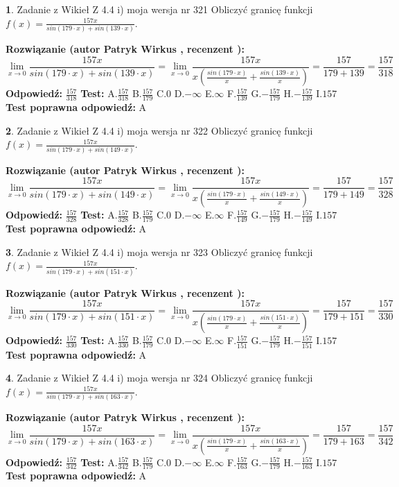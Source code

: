\documentclass[12pt, a4paper]{article}
\theoremstyle{definition} %
\newtheorem{zad}{}
\newcommand{\zadStart}[1]{\begin{zad}#1\newline}
\newcommand{\zadStop}{\end{zad}}
\newcommand{\rozwStart}[2]{\noindent \textbf{Rozwiązanie (autor #1 , recenzent #2): }\newline}
\newcommand{\rozwStop}{\newline}
\newcommand{\odpStart}{\noindent \textbf{Odpowiedź:}\newline}
\newcommand{\odpStop}{\newline}
\newcommand{\testStart}{\noindent \textbf{Test:}\newline}
\newcommand{\testStop}{\newline}
\newcommand{\kluczStart}{\noindent \textbf{Test poprawna odpowiedź:}\newline}
\newcommand{\kluczStop}{\newline}
\begin{document}
\zadStart{Zadanie z Wikieł Z 4.4 i) moja wersja nr 321}
Obliczyć granicę funkcji $f(x)=\frac{157x}{sin(179\cdot x) +sin(139\cdot x)}$.
\zadStop
\rozwStart{Patryk Wirkus}{}
$$\lim\limits_{x\to 0}\frac{157x}{sin(179\cdot x) +sin(139\cdot x)}=\lim\limits_{x\to 0}\frac{157x}{x(\frac{sin(179\cdot x)}{x}+\frac{sin(139\cdot x)}{x})}=\frac{157}{179+139} = \frac{157}{318}$$
\rozwStop
\odpStart
$\frac{157}{318}$
\odpStop
\testStart
A.$\frac{157}{318}$
B.$\frac{157}{179}$
C.$0$
D.$-\infty$
E.$\infty$
F.$\frac{157}{139}$
G.$-\frac{157}{179}$
H.$-\frac{157}{139}$
I.$157$
\testStop
\kluczStart
A
\kluczStop



\zadStart{Zadanie z Wikieł Z 4.4 i) moja wersja nr 322}
Obliczyć granicę funkcji $f(x)=\frac{157x}{sin(179\cdot x) +sin(149\cdot x)}$.
\zadStop
\rozwStart{Patryk Wirkus}{}
$$\lim\limits_{x\to 0}\frac{157x}{sin(179\cdot x) +sin(149\cdot x)}=\lim\limits_{x\to 0}\frac{157x}{x(\frac{sin(179\cdot x)}{x}+\frac{sin(149\cdot x)}{x})}=\frac{157}{179+149} = \frac{157}{328}$$
\rozwStop
\odpStart
$\frac{157}{328}$
\odpStop
\testStart
A.$\frac{157}{328}$
B.$\frac{157}{179}$
C.$0$
D.$-\infty$
E.$\infty$
F.$\frac{157}{149}$
G.$-\frac{157}{179}$
H.$-\frac{157}{149}$
I.$157$
\testStop
\kluczStart
A
\kluczStop



\zadStart{Zadanie z Wikieł Z 4.4 i) moja wersja nr 323}
Obliczyć granicę funkcji $f(x)=\frac{157x}{sin(179\cdot x) +sin(151\cdot x)}$.
\zadStop
\rozwStart{Patryk Wirkus}{}
$$\lim\limits_{x\to 0}\frac{157x}{sin(179\cdot x) +sin(151\cdot x)}=\lim\limits_{x\to 0}\frac{157x}{x(\frac{sin(179\cdot x)}{x}+\frac{sin(151\cdot x)}{x})}=\frac{157}{179+151} = \frac{157}{330}$$
\rozwStop
\odpStart
$\frac{157}{330}$
\odpStop
\testStart
A.$\frac{157}{330}$
B.$\frac{157}{179}$
C.$0$
D.$-\infty$
E.$\infty$
F.$\frac{157}{151}$
G.$-\frac{157}{179}$
H.$-\frac{157}{151}$
I.$157$
\testStop
\kluczStart
A
\kluczStop



\zadStart{Zadanie z Wikieł Z 4.4 i) moja wersja nr 324}
Obliczyć granicę funkcji $f(x)=\frac{157x}{sin(179\cdot x) +sin(163\cdot x)}$.
\zadStop
\rozwStart{Patryk Wirkus}{}
$$\lim\limits_{x\to 0}\frac{157x}{sin(179\cdot x) +sin(163\cdot x)}=\lim\limits_{x\to 0}\frac{157x}{x(\frac{sin(179\cdot x)}{x}+\frac{sin(163\cdot x)}{x})}=\frac{157}{179+163} = \frac{157}{342}$$
\rozwStop
\odpStart
$\frac{157}{342}$
\odpStop
\testStart
A.$\frac{157}{342}$
B.$\frac{157}{179}$
C.$0$
D.$-\infty$
E.$\infty$
F.$\frac{157}{163}$
G.$-\frac{157}{179}$
H.$-\frac{157}{163}$
I.$157$
\testStop
\kluczStart
A
\kluczStop
\end{document}
